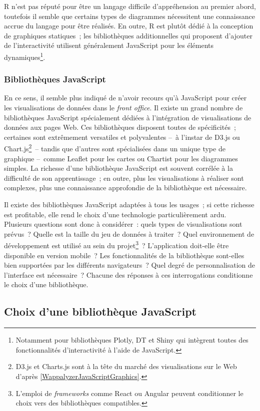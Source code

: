 \documentclass[a4paper,12pt,twoside]{book}
\newcommand{\eng}{\emph}
\newcommand{\fo}{\eng{front office}\xspace}
\begin{document}
R n'est pas réputé pour être un langage difficile d'appréhension au premier abord, toutefois il semble que certains types de diagrammes nécessitent une connaissance accrue du langage pour être réalisés. En outre, R est plutôt dédié à la conception de graphiques statiques~; les bibliothèques additionnelles qui proposent d'ajouter de l'interactivité utilisent généralement JavaScript pour les éléments dynamiques\footnote{Notamment pour bibliothèques Plotly, DT et Shiny qui intègrent toutes des fonctionnalités d'interactivité à l'aide de JavaScript.}.

			\subsubsection{Bibliothèques JavaScript}
En ce sens, il semble plus indiqué de n'avoir recours qu'à JavaScript pour créer les visualisations de données dans le \fo. Il existe un grand nombre de bibliothèques JavaScript spécialement dédiées à l'intégration de visualisations de données aux pages Web. Ces bibliothèques disposent toutes de spécificités~; certaines sont extrêmement versatiles et polyvalentes –~à l'instar de D3.js ou Chart.js\footnote{D3.js et Charts.js sont à la tête du marché des visualisations sur le Web d'après \ref{WappalyzerJavaScriptGraphics}.}~– tandis que d'autres sont spécialisées dans un unique type de graphique –~comme Leaflet pour les cartes ou Chartist pour les diagrammes simples. La richesse d'une bibliothèque JavaScript est souvent corrélée à la difficulté de son apprentissage~; en outre, plus les visualisations à réaliser sont complexes, plus une connaissance approfondie de la bibliothèque est nécessaire.

Il existe des bibliothèques JavaScript adaptées à tous les usages~; si cette richesse est profitable, elle rend le choix d'une technologie particulièrement ardu. Plusieurs questions sont donc à considérer~: quels types de visualisations sont prévus~? Quelle est la taille du jeu de données à traiter~? Quel environnement de développement est utilisé au sein du projet\footnote{L'emploi de \eng{frameworks} comme React ou Angular peuvent conditionner le choix vers des bibliothèques compatibles.}~? L'application doit-elle être disponible en version mobile~? Les fonctionnalités de la bibliothèque sont-elles bien supportées par les différents navigateurs~? Quel degré de personnalisation de l'interface est nécessaire~? Chacune des réponses à ces interrogations conditionne le choix d'une bibliothèque.

		\subsection{Choix d'une bibliothèque JavaScript}
\end{document}
